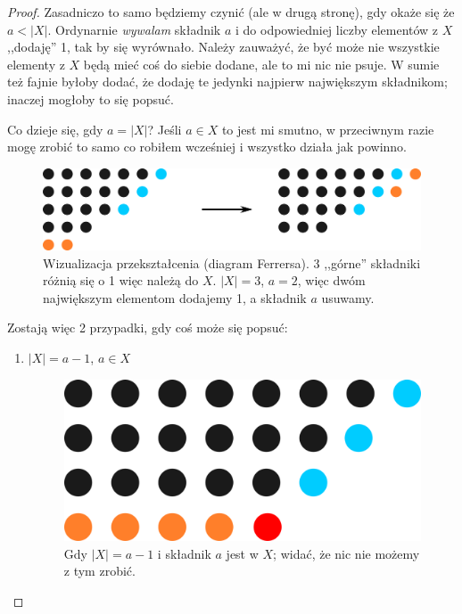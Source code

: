 \begin{proof}
	Zasadniczo to samo będziemy czynić (ale w drugą stronę), gdy okaże się że $a < |X| $. Ordynarnie \textit{wywalam} składnik $a$ i do odpowiedniej liczby elementów z $X$  ,,dodaję'' 1, tak by się wyrównało. Należy zauważyć, że być może nie wszystkie elementy z $X$ będą mieć coś do siebie dodane, ale to mi nic nie psuje. W sumie też fajnie byłoby dodać, że dodaję te jedynki najpierw największym składnikom; inaczej mogłoby to się popsuć.

	Co dzieje się, gdy $a = |X|$? Jeśli $a \in X$ to jest mi smutno, w przeciwnym razie mogę zrobić to samo co robiłem wcześniej i wszystko działa jak powinno.

	\begin{figure}[H]
		\centering
		\includegraphics{images/case_1.png}
		\caption{Wizualizacja przekształcenia (diagram Ferrersa). 3 ,,górne'' składniki różnią się o 1 więc należą do $X$. $|X| = 3$, $a = 2$, więc dwóm największym elementom dodajemy 1, a składnik $a$ usuwamy.}
	\end{figure}

	Zostają więc 2 przypadki, gdy coś może się popsuć:
	\begin{enumerate}
		\item $|X| = a - 1$, $a \in X$
		      \begin{figure}[H]
			      \centering
			      \includegraphics{images/irytujacy_1.png}
			      \caption{Gdy $|X| = a - 1$ i składnik $a$ jest w $X$; widać, że nic nie możemy z tym zrobić.}
		      \end{figure}


\end{enumerate}
\end{proof}
